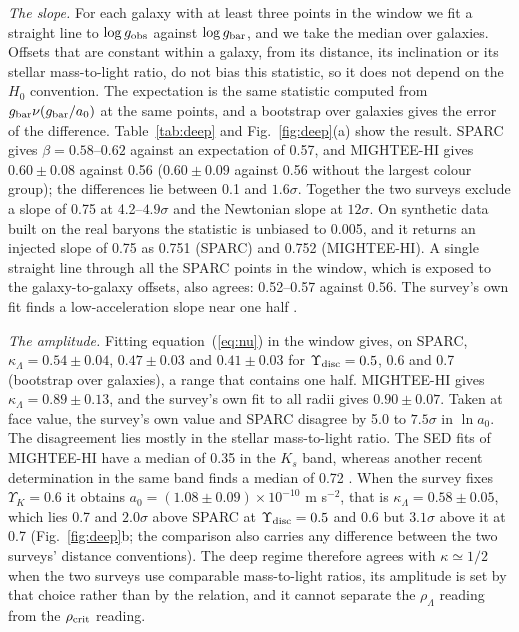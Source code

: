 \documentclass[fleqn,usenatbib]{mnras}
\begin{document}
\emph{The slope.} For each galaxy with at least three points in the window we fit a straight line to $\log g_{\rm obs}$ against $\log g_{\rm bar}$, and we take the median over galaxies. Offsets that are constant within a galaxy, from its distance, its inclination or its stellar mass-to-light ratio, do not bias this statistic, so it does not depend on the $H_0$ convention. The expectation is the same statistic computed from $g_{\rm bar}\nu(g_{\rm bar}/a_0)$ at the same points, and a bootstrap over galaxies gives the error of the difference. Table~\ref{tab:deep} and Fig.~\ref{fig:deep}(a) show the result. SPARC gives $\beta=0.58$--$0.62$ against an expectation of 0.57, and MIGHTEE-HI gives $0.60\pm0.08$ against 0.56 ($0.60\pm0.09$ against 0.56 without the largest colour group); the differences lie between 0.1 and $1.6\sigma$. Together the two surveys exclude a slope of 0.75 at 4.2--$4.9\sigma$ and the Newtonian slope at $12\sigma$. On synthetic data built on the real baryons the statistic is unbiased to 0.005, and it returns an injected slope of 0.75 as 0.751 (SPARC) and 0.752 (MIGHTEE-HI). A single straight line through all the SPARC points in the window, which is exposed to the galaxy-to-galaxy offsets, also agrees: 0.52--0.57 against 0.56. The survey's own fit finds a low-acceleration slope near one half \citep{Varasteanu2025}.

\emph{The amplitude.} Fitting equation~(\ref{eq:nu}) in the window gives, on SPARC, $\kappa_\Lambda=0.54\pm0.04$, $0.47\pm0.03$ and $0.41\pm0.03$ for $\Upsilon_{\rm disc}=0.5$, 0.6 and 0.7 (bootstrap over galaxies), a range that contains one half. MIGHTEE-HI gives $\kappa_\Lambda=0.89\pm0.13$, and the survey's own fit to all radii gives $0.90\pm0.07$. Taken at face value, the survey's own value and SPARC disagree by 5.0 to $7.5\sigma$ in $\ln a_0$. The disagreement lies mostly in the stellar mass-to-light ratio. The SED fits of MIGHTEE-HI have a median of 0.35 in the $K_s$ band, whereas another recent determination in the same band finds a median of 0.72 \citep{Marasco2025}. When the survey fixes $\Upsilon_K=0.6$ it obtains $a_0=(1.08\pm0.09)\times10^{-10}$ m s$^{-2}$, that is $\kappa_\Lambda=0.58\pm0.05$, which lies 0.7 and $2.0\sigma$ above SPARC at $\Upsilon_{\rm disc}=0.5$ and 0.6 but $3.1\sigma$ above it at 0.7 (Fig.~\ref{fig:deep}b; the comparison also carries any difference between the two surveys' distance conventions). The deep regime therefore agrees with $\kappa\simeq1/2$ when the two surveys use comparable mass-to-light ratios, its amplitude is set by that choice rather than by the relation, and it cannot separate the $\rho_\Lambda$ reading from the $\rho_{\rm crit}$ reading.
\end{document}
